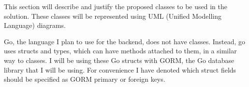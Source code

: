 \documentclass[../../main.tex]{subfiles}
\begin{document}
\noindent This section will describe and justify the proposed classes to be used in the solution.
These classes will be represented using UML (Unified Modelling Language) diagrams.


\noindent Go, the language I plan to use for the backend, does not have classes.
Instead, go uses structs and types, which can have methods attached to them, in a similar way
to classes. I will be using these Go structs with GORM, the Go database library that
I will be using. For convenience I have denoted which struct fields should be specified as
GORM primary or foreign keys. \\

\end{document}
